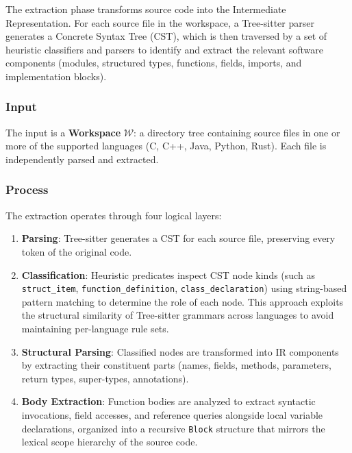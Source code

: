 The extraction phase transforms source code into the Intermediate
Representation. For each source file in the workspace, a Tree-sitter
parser \cite{brunsfeld_treesitter_2018} generates a Concrete Syntax Tree
(CST), which is then traversed by a set of heuristic classifiers and
parsers to identify and extract the relevant software components
(modules, structured types, functions, fields, imports, and
implementation blocks).

\subsubsection{Input}

The input is a \textbf{Workspace} $\mathcal{W}$: a directory tree
containing source files in one or more of the supported languages (C,
C++, Java, Python, Rust). Each file is independently parsed and extracted.

\subsubsection{Process}

The extraction operates through four logical layers:

\begin{enumerate}
  \item \textbf{Parsing}: Tree-sitter generates a CST for each source
    file, preserving every token of the original code.
  \item \textbf{Classification}: Heuristic predicates inspect CST
    node kinds (such as \texttt{struct\_item},
    \texttt{function\_definition}, \texttt{class\_declaration}) using
    string-based pattern matching to determine the role of each node.
    This approach exploits the structural similarity of Tree-sitter
    grammars across languages to avoid maintaining per-language rule sets.
  \item \textbf{Structural Parsing}: Classified nodes are transformed
    into IR components by extracting their constituent parts (names,
    fields, methods, parameters, return types, super-types, annotations).
  \item \textbf{Body Extraction}: Function bodies are analyzed to
    extract syntactic invocations, field accesses, and reference queries
    alongside local variable declarations, organized into a recursive
    \texttt{Block} structure that mirrors the lexical scope hierarchy of
    the source code.
\end{enumerate}

